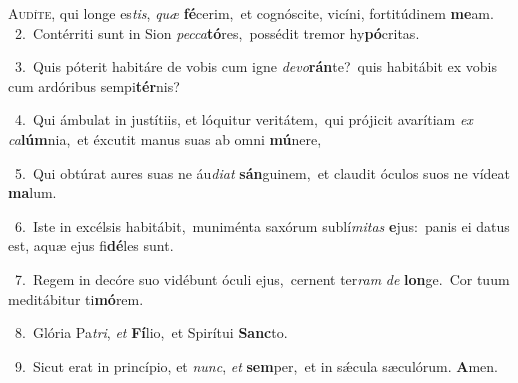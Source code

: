\lettrine{\initial\textcolor{\initialcolor}{A}}{udíte,} qui longe es\-\textit{tis}\-, \textit{quæ} \textbf{fé}\-cerim,~\star et cognóscite, vicíni, fortitúdinem \textbf{me}\-am.\\
{\numbfont\textcolor{\numbcolor}{~2.}}~Contérriti sunt in Sion \textit{pec}\-\textit{ca}\textbf{tó}res,~\star possédit tremor hy\-\textbf{pó}\-critas.\par
{\numbfont\textcolor{\numbcolor}{~3.}}~Quis póterit habitáre de vobis cum igne \textit{de}\-\textit{vo}\textbf{rán}te?~\star quis habitábit ex vobis cum ardóribus sempi\-\textbf{tér}\-nis?\par
{\numbfont\textcolor{\numbcolor}{~4.}}~Qui ámbulat in justítiis, et lóquitur veritátem,~\dagger qui prójicit avarítiam \textit{ex} \textit{ca}\-\textbf{lúm}nia,~\star et éxcutit manus suas ab omni \textbf{mú}\-nere,\par
{\numbfont\textcolor{\numbcolor}{~5.}}~Qui obtúrat aures suas ne áu\-\textit{di}\-\textit{at} \textbf{sán}\-guinem,~\star et claudit óculos suos ne vídeat \textbf{ma}\-lum.\par
{\numbfont\textcolor{\numbcolor}{~6.}}~Iste in excélsis habitábit,~\dagger muniménta saxórum sublí\-\textit{mi}\-\textit{tas} \textbf{e}\-jus:~\star panis ei datus est, aquæ ejus fi\-\textbf{dé}\-les sunt.\par
{\numbfont\textcolor{\numbcolor}{~7.}}~Regem in decóre suo vidébunt óculi ejus,~\dagger cernent ter\textit{ram} \textit{de} \textbf{lon}\-ge.~\star Cor tuum meditábitur ti\-\textbf{mó}\-rem.\par
{\numbfont\textcolor{\numbcolor}{~8.}}~Glória Pa\-\textit{tri}\-, \textit{et} \textbf{Fí}\-lio,~\star et Spirítui \textbf{Sanc}\-to.\par
{\numbfont\textcolor{\numbcolor}{~9.}}~Sicut erat in princípio, et \textit{nunc}\-, \textit{et} \textbf{sem}\-per,~\star et in sǽcula sæculórum. \textbf{A}\-men.\par
